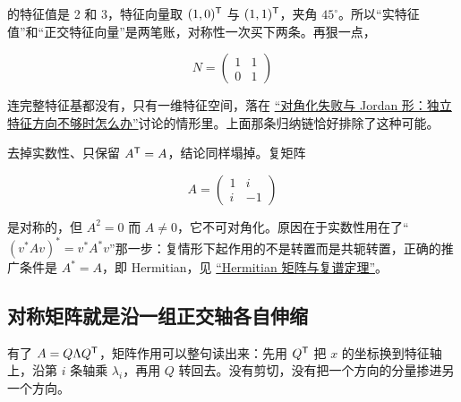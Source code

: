 的特征值是 2 和 3，特征向量取 \((1,0)^{\mathsf{T}}\) 与 \((1,1)^{\mathsf{T}}\)，夹角 \(45^{\circ}\)。所以``实特征值''和``正交特征向量''是两笔账，对称性一次买下两条。再狠一点，

\[
N=\begin{pmatrix}1&1\\0&1\end{pmatrix}
\]

连完整特征基都没有，只有一维特征空间，落在 \hyperref[sec:03-Linear-Algebra/05-Eigenvalues-and-Eigenvectors/03]{``对角化失败与 Jordan 形：独立特征方向不够时怎么办''}讨论的情形里。上面那条归纳链恰好排除了这种可能。

去掉实数性、只保留 \(A^{\mathsf{T}}=A\)，结论同样塌掉。复矩阵

\[
A=\begin{pmatrix}1&i\\i&-1\end{pmatrix}
\]

是对称的，但 \(A^2=0\) 而 \(A\ne0\)，它不可对角化。原因在于实数性用在了``\((v^*Av)^*=v^*A^*v\)''那一步：复情形下起作用的不是转置而是共轭转置，正确的推广条件是 \(A^*=A\)，即 Hermitian，见 \hyperref[sec:03-Linear-Algebra/08-Complex-Matrices-and-Fourier-Structure/02]{``Hermitian 矩阵与复谱定理''}。

\subsection{对称矩阵就是沿一组正交轴各自伸缩}

有了 \(A=Q\Lambda Q^{\mathsf{T}}\)，矩阵作用可以整句读出来：先用 \(Q^{\mathsf{T}}\) 把 \(x\) 的坐标换到特征轴上，沿第 \(i\) 条轴乘 \(\lambda_i\)，再用 \(Q\) 转回去。没有剪切，没有把一个方向的分量掺进另一个方向。

